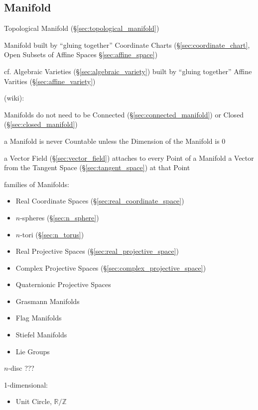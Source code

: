 \subsection{Manifold}\label{sec:manifold}



\fist Topological Manifold (\S\ref{sec:topological_manifold})

Manifold built by ``gluing together'' Coordinate Charts
(\S\ref{sec:coordinate_chart}, Open Subsets of Affine Spaces
\S\ref{sec:affine_space})

cf. Algebraic Varieties (\S\ref{sec:algebraic_variety}) built by ``gluing
together'' Affine Varities (\S\ref{sec:affine_variety})

(wiki):

Manifolds do not need to be Connected (\S\ref{sec:connected_manifold}) or
Closed (\S\ref{sec:closed_manifold})

a Manifold is never Countable unless the Dimension of the Manifold is $0$

a Vector Field (\S\ref{sec:vector_field}) attaches to every Point of a Manifold
a Vector from the Tangent Space (\S\ref{sec:tangent_space}) at that Point

families of Manifolds:
\begin{itemize}
  \item Real Coordinate Spaces (\S\ref{sec:real_coordinate_space})
  \item $n$-spheres (\S\ref{sec:n_sphere})
  \item $n$-tori (\S\ref{sec:n_torus})
  \item Real Projective Spaces (\S\ref{sec:real_projective_space})
  \item Complex Projective Spaces (\S\ref{sec:complex_projective_space})
  \item Quaternionic Projective Spaces
  \item Grasmann Manifolds
  \item Flag Manifolds
  \item Stiefel Manifolds
  \item Lie Groups
\end{itemize}

$n$-disc ??? %

1-dimensional:

\begin{itemize}
  \item Unit Circle, $\mathbb{R}/\mathbb{Z}$
\end{itemize}

